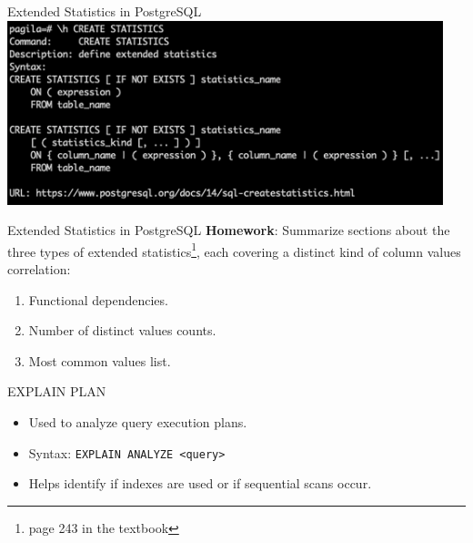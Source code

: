 \documentclass[aspectratio=169]{beamer}
\begin{document}
\begin{frame}{Extended Statistics in PostgreSQL}
    \centering
    \includegraphics[width=0.95\textwidth]{figures/create_stats}
\end{frame}


\begin{frame}{Extended Statistics in PostgreSQL}
    \Large \textbf{Homework}:
    Summarize sections about the three types of extended statistics\footnote{page 243 in the textbook}, each covering a distinct kind of column values correlation:
    \begin{enumerate}
        \item Functional dependencies.
        \item Number of distinct values counts.
        \item Most common values list.
    \end{enumerate}
\end{frame}

\begin{frame}{EXPLAIN PLAN}
    \begin{itemize}
        \item Used to analyze query execution plans.
        \item Syntax: \texttt{EXPLAIN ANALYZE <query>}
        \item Helps identify if indexes are used or if sequential scans occur.
    \end{itemize}
\end{frame}

\end{document}
